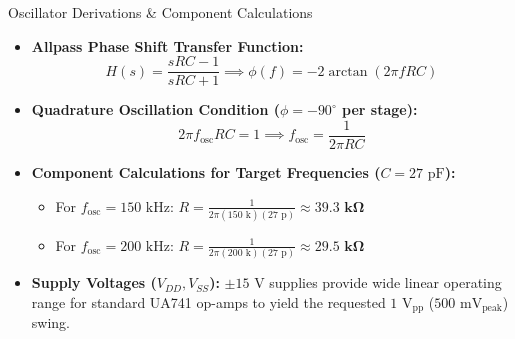 \documentclass{beamer}
\begin{document}
\begin{frame}{Oscillator Derivations \& Component Calculations}
  \small
  \setlength{\abovedisplayskip}{2pt}
  \setlength{\belowdisplayskip}{2pt}
  \begin{itemize}
    \item \textbf{Allpass Phase Shift Transfer Function:}
    \begin{equation*}
      H(s) = \frac{sRC - 1}{sRC + 1} \implies \phi(f) = -2\arctan(2\pi f RC)
    \end{equation*}
    \item \textbf{Quadrature Oscillation Condition ($\phi = -90^\circ$ per stage):}
    \begin{equation*}
      2\pi f_{\text{osc}} RC = 1 \implies f_{\text{osc}} = \frac{1}{2\pi RC}
    \end{equation*}
    \item \textbf{Component Calculations for Target Frequencies ($C = 27\text{ pF}$):}
    \begin{itemize}
      \item For $f_{\text{osc}} = 150\text{ kHz}$: $R = \frac{1}{2\pi (150\text{ k})(27\text{ p})} \approx \mathbf{39.3\text{ k}\Omega}$
      \item For $f_{\text{osc}} = 200\text{ kHz}$: $R = \frac{1}{2\pi (200\text{ k})(27\text{ p})} \approx \mathbf{29.5\text{ k}\Omega}$
    \end{itemize}
    \item \textbf{Supply Voltages ($V_{DD}, V_{SS}$):} $\pm 15\text{ V}$ supplies provide wide linear operating range for standard UA741 op-amps to yield the requested $1\text{ V}_{\text{pp}}$ ($500\text{ mV}_{\text{peak}}$) swing.
  \end{itemize}
\end{frame}
\end{document}
